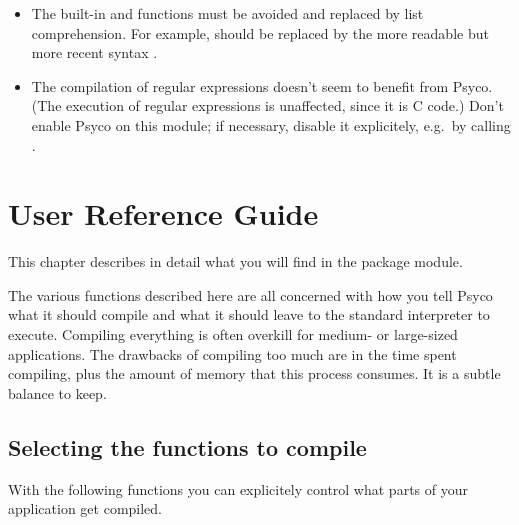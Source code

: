 \documentclass{manual}
\begin{document}
\begin{itemize}
\item The built-in  and  functions must be avoided and replaced by list comprehension.  For example,  should be replaced by the more readable but more recent syntax .
\item The compilation of regular expressions doesn't seem to benefit from Psyco.  (The execution of regular expressions is unaffected, since it is C code.)  Don't enable Psyco on this module; if necessary, disable it explicitely, e.g.\ by calling .
\end{itemize}



\chapter{User Reference Guide}


This chapter describes in detail what you will find in the  package module.

The various functions described here are all concerned with how you tell Psyco what it should compile and what it should leave to the standard interpreter to execute.  Compiling everything is often overkill for medium- or large-sized applications.  The drawbacks of compiling too much are in the time spent compiling, plus the amount of memory that this process consumes.  It is a subtle balance to keep.


\section{Selecting the functions to compile}

With the following functions you can explicitely control what parts of your application get compiled.
\end{document}
